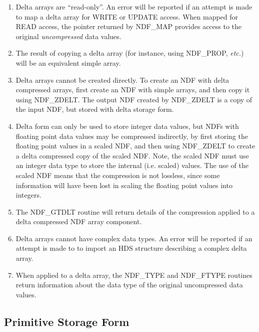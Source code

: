 \documentclass[twoside,11pt,nolof]{starlink}
\begin{document}
\begin{enumerate}

\item Delta arrays are ``read-only''. An error will be reported if an
attempt is made to map a delta array for WRITE or UPDATE access. When
mapped for READ access, the pointer returned by NDF\_MAP provides access
to the original \emph{uncompressed} data values.

\item The result of copying a delta array (for instance, using
NDF\_PROP, \emph{etc.}) will be an equivalent simple array.

\item Delta arrays cannot be created directly. To create an NDF with
delta compressed arrays, first create an NDF with simple arrays, and then
copy it using NDF\_ZDELT. The output NDF created by NDF\_ZDELT is a copy
of the input NDF, but stored with delta storage form.

\item Delta form can only be used to store integer data values, but
NDFs with floating point data values may be compressed indirectly, by
first storing the floating point values in a scaled NDF, and then using
NDF\_ZDELT to create a delta compressed copy of the scaled NDF. Note, the
scaled NDF must use an integer data type to store the internal (i.e.
scaled) values. The use of the scaled NDF means that the compression is
not lossless, since some information will have been lost in scaling the
floating point values into integers.

\item The NDF\_GTDLT routine will return details of the compression
applied to a delta compressed NDF array component.

\item Delta arrays cannot have complex data types. An error will be
reported if an attempt is made to to import an HDS structure describing a
complex delta array.

\item When applied to a delta array, the NDF\_TYPE and NDF\_FTYPE routines
return information about the data type of the original uncompressed data
values.

\end{enumerate}



\subsection{\label{ss:implicitformchange}\label{ss:primitiveform}Primitive Storage Form}
\end{document}
